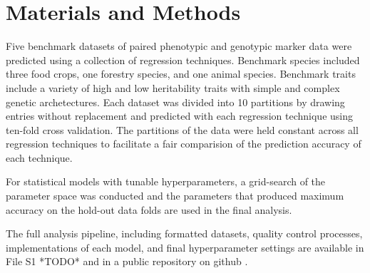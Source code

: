 \documentclass[9pt,twocolumn,twoside]{g3_article/gsag3jnl}
\begin{document}

\section*{Materials and Methods}

Five benchmark datasets of paired phenotypic and genotypic marker data were predicted 
using a collection of regression techniques. Benchmark species included three food crops, 
one forestry species, and one animal species. Benchmark traits include a variety of high and low
heritability traits with simple and complex genetic archetectures. Each dataset was divided
into 10 partitions by drawing entries without replacement and predicted with each
regression technique using ten-fold cross validation. The partitions of the data were 
held constant across all regression techniques to facilitate a fair comparision of the
prediction accuracy of each technique.

For statistical models with tunable hyperparameters, a grid-search of the parameter 
space was conducted and the parameters that produced maximum accuracy on the hold-out
data folds are used in the final analysis. 

The full analysis pipeline, including formatted datasets, quality control processes, 
implementations of each model, and final hyperparameter settings are available in File S1 *TODO* and
in a public repository on github \citep{mcdowell2016}.

\end{document}

